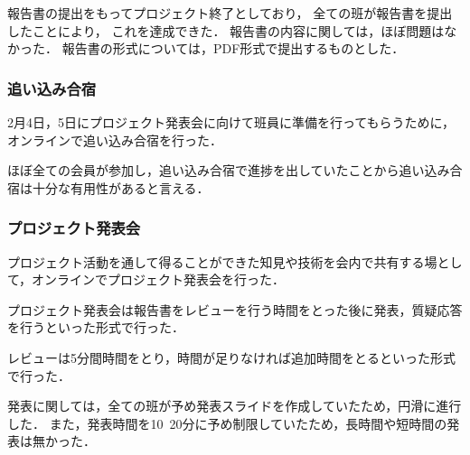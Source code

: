 報告書の提出をもってプロジェクト終了としており，
全ての班が報告書を提出したことにより，
これを達成できた．
報告書の内容に関しては，ほぼ問題はなかった．
報告書の形式については，PDF形式で提出するものとした．

\subsubsection*{追い込み合宿}
2月4日，5日にプロジェクト発表会に向けて班員に準備を行ってもらうために，オンラインで追い込み合宿を行った．

ほぼ全ての会員が参加し，追い込み合宿で進捗を出していたことから追い込み合宿は十分な有用性があると言える．

\subsubsection*{プロジェクト発表会}

プロジェクト活動を通して得ることができた知見や技術を会内で共有する場として，オンラインでプロジェクト発表会を行った．

プロジェクト発表会は報告書をレビューを行う時間をとった後に発表，質疑応答を行うといった形式で行った．

レビューは5分間時間をとり，時間が足りなければ追加時間をとるといった形式で行った．

発表に関しては，全ての班が予め発表スライドを作成していたため，円滑に進行した．
また，発表時間を10~20分に予め制限していたため，長時間や短時間の発表は無かった．

